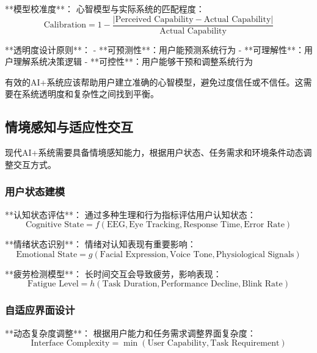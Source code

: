 **模型校准度**：
心智模型与实际系统的匹配程度：
\begin{equation}
\text{Calibration} = 1 - \frac{|\text{Perceived Capability} - \text{Actual Capability}|}{\text{Actual Capability}}
\end{equation}

**透明度设计原则**：
- **可预测性**：用户能预测系统行为
- **可理解性**：用户理解系统决策逻辑
- **可控性**：用户能够干预和调整系统行为

\begin{center}
有效的AI+系统应该帮助用户建立准确的心智模型，避免过度信任或不信任。这需要在系统透明度和复杂性之间找到平衡。
\end{center}

\subsection{情境感知与适应性交互}

现代AI+系统需要具备情境感知能力，根据用户状态、任务需求和环境条件动态调整交互方式。

\subsubsection{用户状态建模} %

**认知状态评估**：
通过多种生理和行为指标评估用户认知状态：
\begin{equation}
\text{Cognitive State} = f(\text{EEG}, \text{Eye Tracking}, \text{Response Time}, \text{Error Rate})
\end{equation}

**情绪状态识别**：
情绪对认知表现有重要影响：
\begin{equation}
\text{Emotional State} = g(\text{Facial Expression}, \text{Voice Tone}, \text{Physiological Signals})
\end{equation}

**疲劳检测模型**：
长时间交互会导致疲劳，影响表现：
\begin{equation}
\text{Fatigue Level} = h(\text{Task Duration}, \text{Performance Decline}, \text{Blink Rate})
\end{equation}

\subsubsection{自适应界面设计} %

**动态复杂度调整**：
根据用户能力和任务需求调整界面复杂度：
\begin{equation}
\text{Interface Complexity} = \min(\text{User Capability}, \text{Task Requirement})
\end{equation}

